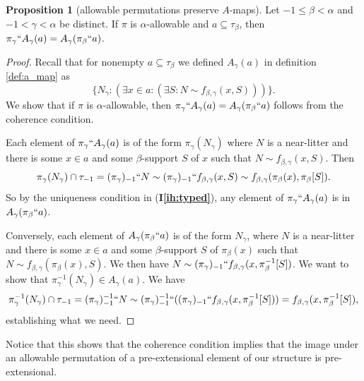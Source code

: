 \documentclass{article}
\newif\ifshowannotations
\newcommand{\annot}[1]{\ifshowannotations\marginpar{#1}\fi}
\theoremstyle{definition}
\newtheorem{proposition}[theorem]{Proposition}
\theoremstyle{remark}
\newcommand{\ihref}[1]{(\textbf{I\ref{#1}})}
\begin{document}
{\begin{proposition}[allowable permutations preserve $A$-maps]\label{prop:allowable_preserves_a_map}
  Let $-1 \leq \beta < \alpha$ and $-1 < \gamma < \alpha$ be distinct.
  If $\pi$ is $\alpha$-allowable and $a \subseteq \tau_\beta$, then $\pi_\gamma``A_\gamma(a)= A_\gamma(\pi_\beta``a)$.
  \annot{\tiny Split apart as per referee request, and fixed up indexing.}
\end{proposition}
\begin{proof}
  Recall that for nonempty  $a\subseteq\tau_\beta$ we defined $A_\gamma(a)$ in definition \ref{def:a_map} as $$\{N_\gamma:(\exists x \in a:(\exists S:N \sim f_{\beta,\gamma}(x,S)))\}.$$
  We show that if $\pi$ is $\alpha$-allowable, then $\pi_\gamma``A_\gamma(a)= A_\gamma(\pi_\beta``a)$ follows from the coherence condition.

  Each element of $\pi_\gamma``A_\gamma(a)$ is of the form $\pi_\gamma(N_\gamma)$ where $N$ is a near-litter and there is some $x \in a$ and some $\beta$-support $S$ of $x$ such that $N \sim f_{\beta,\gamma}(x,S)$.  Then $$\pi_\gamma(N_\gamma)  \cap \tau_{-1} = (\pi_\gamma)_{-1}``N \sim (\pi_\gamma)_{-1}``f_{\beta,\gamma}(x,S) \sim f_{\beta,\gamma}(\pi_\beta(x),\pi_\beta[S]).$$  So by the uniqueness condition in \ihref{ih:typed}, any element of $\pi_\gamma``A_\gamma(a)$ is in $A_\gamma(\pi_\beta``a)$.

  Conversely, each element of $A_\gamma(\pi_\beta``a)$ is of the form $N_\gamma$, where $N$ is a near-litter and there is some $x \in a$ and some $\beta$-support $S$ of $\pi_\beta(x)$ such that $N \sim f_{\beta,\gamma}(\pi_\beta(x),S)$.  We then have $N \sim (\pi_\gamma)_{-1}``f_{\beta,\gamma}(x,\pi_\beta^{-1}[S])$.  We want to show that $\pi_\gamma^{-1}(N_\gamma) \in A_\gamma(a)$.  We have $$\pi_\gamma^{-1}(N_\gamma) \cap \tau_{-1} = (\pi_\gamma)_{-1}^{-1}``N \sim
  (\pi_\gamma)_{-1}^{-1}``((\pi_\gamma)_{-1}``f_{\beta,\gamma}(x,\pi_\beta^{-1}[S])) = f_{\beta,\gamma}(x,\pi_\beta^{-1}[S]),$$ establishing what we need.
\end{proof}

Notice that this shows that the coherence condition implies that the image under an allowable permutation of a pre-extensional element of our structure is pre-extensional.

}
\end{document}
